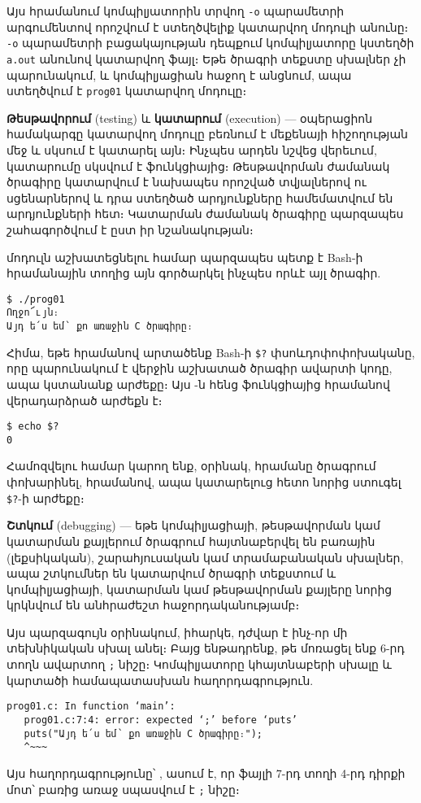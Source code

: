Այս հրամանում կոմպիլյատորին տրվող \verb|-o| պարամետրի արգումենտով
որոշվում է ստեղծվելիք կատարվող մոդուլի անունը։ \verb|-o| պարամետրի
բացակայության դեպքում կոմպիլյատորը կստեղծի \verb|a.out| անունով
կատարվող ֆայլ։ Եթե ծրագրի տեքստը սխալներ չի պարունակում, և կոմպիլյացիան
հաջող է անցնում, ապա ստեղծվում է \verb|prog01| կատարվող մոդուլը։

\textbf{Թեսթավորում} (testing) և \textbf{կատարում} (execution) ---
օպերացիոն համակարգը կատարվող մոդուլը բեռնում է մեքենայի հիշողության
մեջ և սկսում է կատարել այն։ Ինչպես արդեն նշվեց վերեւում, կատարումը
սկսվում է  ֆունկցիայից։ Թեսթավորման ժամանակ ծրագիրը
կատարվում է նախապես որոշված տվյալներով ու սցենարներով և դրա ստեղծած
արդյունքները համեմատվում են արդյունքների հետ։ Կատարման ժամանակ ծրագիրը
պարզապես շահագործվում է ըստ իր նշանակության։

 մոդուլն աշխատեցնելու համար պարզապես պետք է Bash-ի
հրամանային տողից այն գործարկել ինչպես որևէ այլ ծրագիր.

\begin{Verbatim}
$ ./prog01
Ողջո՜ւյն։
Այդ ե՛ս եմ՝ քո առաջին C ծրագիրը։
\end{Verbatim}

Հիմա, եթե  հրամանով արտածենք Bash-ի \verb|$?| փսոևդոփոփոխականը,
որը պարունակում է վերջին աշխատած ծրագիր ավարտի կոդը, ապա կստանանք 
արժեքը։ Այս -ն հենց  ֆունկցիայից 
հրամանով վերադարձրած արժեքն է։

\begin{Verbatim}
$ echo $?
0
\end{Verbatim}

Համոզվելու համար կարող ենք, օրինակ,  հրամանը ծրագրում
փոխարինել,  հրամանով, ապա կատարելուց հետո նորից ստուգել
\verb|$?|-ի արժեքը։

\textbf{Շտկում} (debugging) --- եթե կոմպիլյացիայի, թեսթավորման կամ կատարման
քայլերում ծրագրում հայտնաբերվել են բառային (լեքսիկական), շարահյուսական կամ
տրամաբանական սխալներ,  ապա շտկումներ են կատարվում ծրագրի տեքստում և
կոմպիլյացիայի, կատարման կամ թեսթավորման քայլերը նորից կրկնվում են անհրաժեշտ
հաջորդականությամբ։

Այս պարզագույն օրինակում, իհարկե, դժվար է ինչ-որ մի տեխնիկական սխալ անել։
Բայց ենթադրենք, թե մոռացել ենք 6-րդ տողն ավարտող \verb|;| նիշը։ Կոմպիլյատորը
կհայտնաբերի սխալը և կարտածի համապատասխան հաղորդագրություն.

\begin{Verbatim}
prog01.c: In function ‘main’:
   prog01.c:7:4: error: expected ‘;’ before ‘puts’
   puts("Այդ ե՛ս եմ՝ քո առաջին C ծրագիրը։");
   ^~~~
\end{Verbatim}

Այս հաղորդագրությունը՝ , ասում է, որ  ֆայլի 7-րդ տողի 4-րդ դիրքի մոտ՝
 բառից առաջ սպասվում է \verb|;| նիշը։

